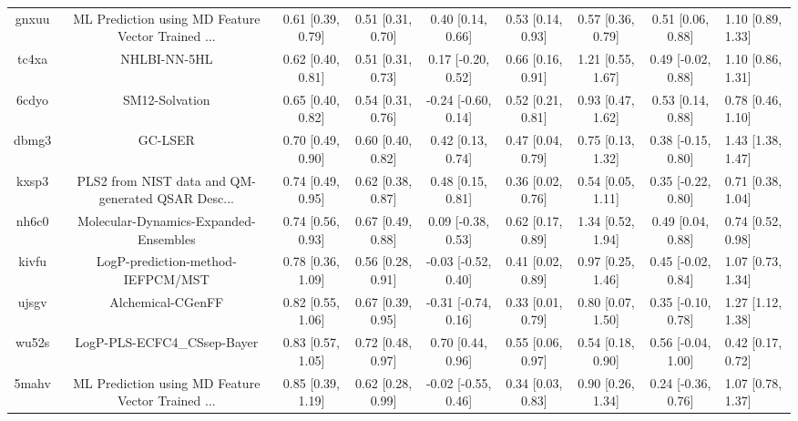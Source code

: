 \documentclass{article}
\begin{document}
\begin{center}
\begin{longtable}{|cccccccc|}
 gnxuu &  ML Prediction using MD Feature Vector Trained ... &  0.61 [0.39, 0.79] &  0.51 [0.31, 0.70] &     0.40 [0.14, 0.66] &  0.53 [0.14, 0.93] &    0.57 [0.36, 0.79] &    0.51 [0.06, 0.88] &     1.10 [0.89, 1.33] \\
 tc4xa &                                       NHLBI-NN-5HL &  0.62 [0.40, 0.81] &  0.51 [0.31, 0.73] &    0.17 [-0.20, 0.52] &  0.66 [0.16, 0.91] &    1.21 [0.55, 1.67] &   0.49 [-0.02, 0.88] &     1.10 [0.86, 1.31] \\
 6cdyo &                                     SM12-Solvation &  0.65 [0.40, 0.82] &  0.54 [0.31, 0.76] &   -0.24 [-0.60, 0.14] &  0.52 [0.21, 0.81] &    0.93 [0.47, 1.62] &    0.53 [0.14, 0.88] &     0.78 [0.46, 1.10] \\
 dbmg3 &                                            GC-LSER &  0.70 [0.49, 0.90] &  0.60 [0.40, 0.82] &     0.42 [0.13, 0.74] &  0.47 [0.04, 0.79] &    0.75 [0.13, 1.32] &   0.38 [-0.15, 0.80] &     1.43 [1.38, 1.47] \\
 kxsp3 &  PLS2 from NIST data and QM-generated QSAR Desc... &  0.74 [0.49, 0.95] &  0.62 [0.38, 0.87] &     0.48 [0.15, 0.81] &  0.36 [0.02, 0.76] &    0.54 [0.05, 1.11] &   0.35 [-0.22, 0.80] &     0.71 [0.38, 1.04] \\
 nh6c0 &              Molecular-Dynamics-Expanded-Ensembles &  0.74 [0.56, 0.93] &  0.67 [0.49, 0.88] &    0.09 [-0.38, 0.53] &  0.62 [0.17, 0.89] &    1.34 [0.52, 1.94] &    0.49 [0.04, 0.88] &     0.74 [0.52, 0.98] \\
 kivfu &                  LogP-prediction-method-IEFPCM/MST &  0.78 [0.36, 1.09] &  0.56 [0.28, 0.91] &   -0.03 [-0.52, 0.40] &  0.41 [0.02, 0.89] &    0.97 [0.25, 1.46] &   0.45 [-0.02, 0.84] &     1.07 [0.73, 1.34] \\
 ujsgv &                                  Alchemical-CGenFF &  0.82 [0.55, 1.06] &  0.67 [0.39, 0.95] &   -0.31 [-0.74, 0.16] &  0.33 [0.01, 0.79] &    0.80 [0.07, 1.50] &   0.35 [-0.10, 0.78] &     1.27 [1.12, 1.38] \\
 wu52s &                        LogP-PLS-ECFC4\_CSsep-Bayer &  0.83 [0.57, 1.05] &  0.72 [0.48, 0.97] &     0.70 [0.44, 0.96] &  0.55 [0.06, 0.97] &    0.54 [0.18, 0.90] &   0.56 [-0.04, 1.00] &     0.42 [0.17, 0.72] \\
 5mahv &  ML Prediction using MD Feature Vector Trained ... &  0.85 [0.39, 1.19] &  0.62 [0.28, 0.99] &   -0.02 [-0.55, 0.46] &  0.34 [0.03, 0.83] &    0.90 [0.26, 1.34] &   0.24 [-0.36, 0.76] &     1.07 [0.78, 1.37] \\

\end{longtable}
\end{center}
\end{document}
